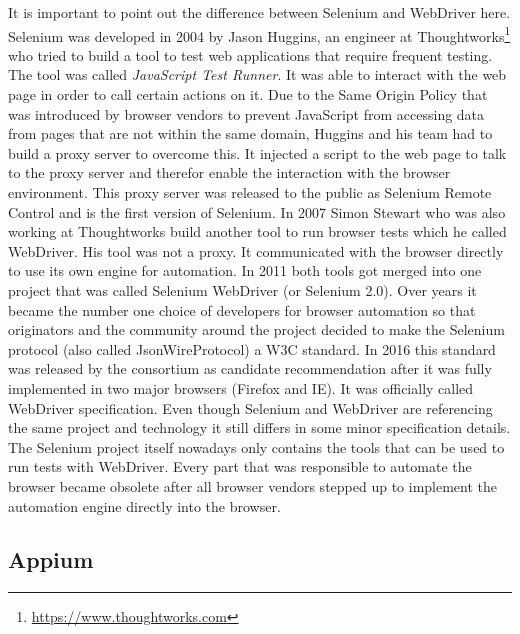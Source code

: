 It is important to point out the difference between Selenium and WebDriver here. Selenium was developed in 2004 by Jason Huggins, an engineer at Thoughtworks\footnote{\url{https://www.thoughtworks.com}} who tried to build a tool to test web applications that require frequent testing. The tool was called \textit{JavaScript Test Runner}. It was able to interact with the web page in order to call certain actions on it. Due to the Same Origin Policy that was introduced by browser vendors to prevent JavaScript from accessing data from pages that are not within the same domain, Huggins and his team had to build a proxy server to overcome this. It injected a script to the web page to talk to the proxy server and therefor enable the interaction with the browser environment. This proxy server was released to the public as Selenium Remote Control and is the first version of Selenium. In 2007 Simon Stewart who was also working at Thoughtworks build another tool to run browser tests which he called WebDriver. His tool was not a proxy. It communicated with the browser directly to use its own engine for automation. In 2011 both tools got merged into one project that was called Selenium WebDriver (or Selenium 2.0). Over years it became the number one choice of developers for browser automation so that originators and the community around the project decided to make the Selenium protocol (also called JsonWireProtocol) a W3C standard. In 2016 this standard was released by the consortium as candidate recommendation after it was fully implemented in two major browsers (Firefox and IE). It was officially called WebDriver specification. Even though Selenium and WebDriver are referencing the same project and technology it still differs in some minor specification details. The Selenium project itself nowadays only contains the tools that can be used to run tests with WebDriver. Every part that was responsible to automate the browser became obsolete after all browser vendors stepped up to implement the automation engine directly into the browser.

\subsection{Appium\label{sec:appium}}

